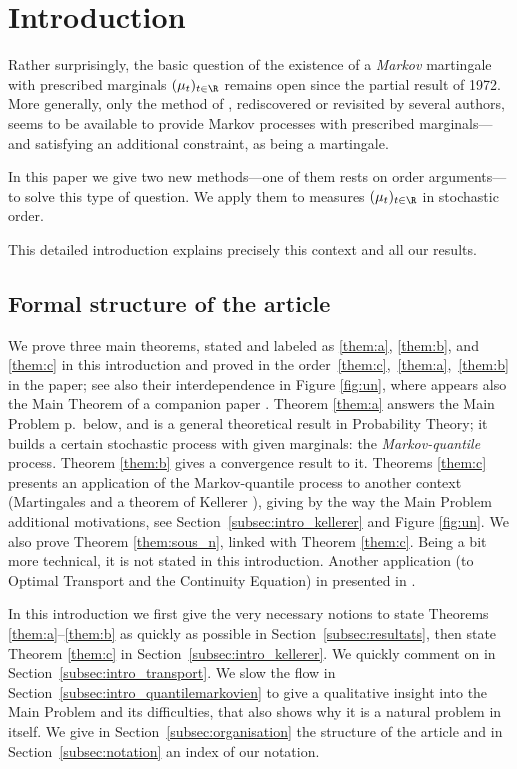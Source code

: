 \section{Introduction}\label{sec:intro}
Rather surprisingly, the basic question of the existence of a \emph{Markov} martingale with prescribed marginals $(\mu_t)_{t\in\R}$ remains open since the partial result \cite{Ke72} of 1972. More generally, only the method of \cite{Ke72}, rediscovered or revisited by several authors, seems to be available to provide Markov processes with prescribed marginals---and satisfying an additional constraint, as being a martingale.

In this paper we give two new methods---one of them rests on order arguments---to solve this type of question. We apply them to measures $(\mu_t)_{t\in\R}$ in stochastic order.

This detailed introduction explains precisely this context and all our results.

\subsection{Formal structure of the article}\label{subsec:formal} We prove three main theorems, stated and labeled as \ref{them:a}, \ref{them:b}, and \ref{them:c} in this introduction and proved in the order~\ref{them:c},~\ref{them:a},~\ref{them:b} in the paper; see also their interdependence in Figure \ref{fig:un}, where appears also the Main Theorem of a companion paper \cite{BouJui2}. Theorem \ref{them:a} answers the Main Problem p.\,\pageref{problem} below, and is a general theoretical result in Probability Theory; it builds a certain stochastic process with given marginals: the \emph{Markov-quantile} process. Theorem \ref{them:b} gives a convergence result to it. Theorems \ref{them:c} presents an application of the Markov-quantile process to another context (Martingales and a theorem of Kellerer \cite{Ke72,Ke73}), giving by the way the Main Problem additional motivations, see Section~\ref{subsec:intro_kellerer} and Figure \ref{fig:un}. We also prove Theorem \ref{them:sous_n}, linked with Theorem \ref{them:c}. Being a bit more technical, it is not stated in this introduction. Another application (to Optimal Transport and the Continuity Equation) in presented in \cite{BouJui2}.

In this introduction we first give the very necessary notions to state Theorems \ref{them:a}--\ref{them:b} as quickly as possible in Section~\ref{subsec:resultats}, then state Theorem \ref{them:c} in Section~\ref{subsec:intro_kellerer}. We quickly comment on \cite{BouJui2} in Section~\ref{subsec:intro_transport}. We slow the flow in Section~\ref{subsec:intro_quantilemarkovien} to give a qualitative insight into the Main Problem and its difficulties, that also shows why it is a natural problem in itself. We give in Section~\ref{subsec:organisation} the structure of the article and in Section~\ref{subsec:notation} an index of our notation.

